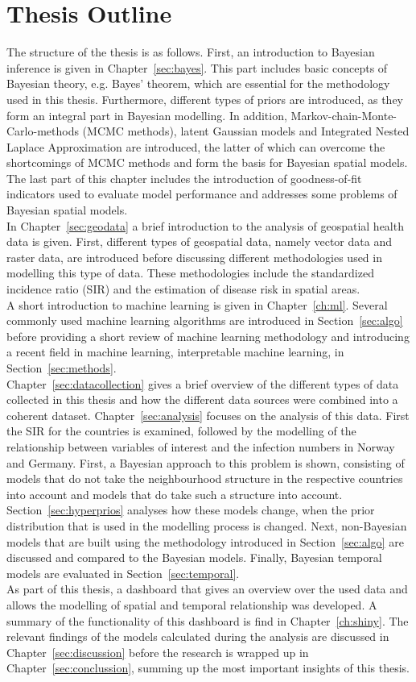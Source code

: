\section{Thesis Outline}
The structure of the thesis is as follows. First, an introduction to Bayesian inference is given in Chapter~\ref{sec:bayes}. This part includes basic concepts of Bayesian theory, e.g. Bayes' theorem, which are essential for the methodology used in this thesis. Furthermore, different types of priors are introduced, as they form an integral part in Bayesian modelling. In addition, Markov-chain-Monte-Carlo-methods (MCMC methods), latent Gaussian models and Integrated Nested Laplace Approximation are introduced, the latter of which can overcome the shortcomings of MCMC methods and form the basis for Bayesian spatial models. The last part of this chapter includes the introduction of goodness-of-fit indicators used to evaluate model performance and addresses some problems of Bayesian spatial models. \\
In Chapter~\ref{sec:geodata} a brief introduction to the analysis of geospatial health data is given. First, different types of geospatial data, namely vector data and raster data, are introduced before discussing different methodologies used in modelling this type of data. These methodologies include the standardized incidence ratio (SIR) and the estimation of disease risk in spatial areas. \\
A short introduction to machine learning is given in Chapter~\ref{ch:ml}. Several commonly used machine learning algorithms are introduced in Section~\ref{sec:algo} before providing a short review of machine learning methodology and introducing a recent field in machine learning, interpretable machine learning, in Section~\ref{sec:methods}. \\
Chapter~\ref{sec:datacollection} gives a brief overview of the different types of data collected in this thesis and how the different data sources were combined into a coherent dataset. 
Chapter~\ref{sec:analysis} focuses on the analysis of this data. First the SIR for the countries is examined, followed by the modelling of the relationship between variables of interest and the infection numbers in Norway and Germany. First, a Bayesian approach to this problem is shown, consisting of models that do not take the neighbourhood structure in the respective countries into account and models that do take such a structure into account. Section~\ref{sec:hyperprios} analyses how these models change, when the prior distribution that is used in the modelling process is changed. Next, non-Bayesian models that are built using the methodology introduced in Section~\ref{sec:algo} are discussed and compared to the Bayesian models. Finally, Bayesian temporal models are evaluated in Section~\ref{sec:temporal}. \\
As part of this thesis, a dashboard that gives an overview over the used data and allows the modelling of spatial and temporal relationship was developed. A summary of the functionality of this dashboard is find in Chapter~\ref{ch:shiny}.
The relevant findings of the models calculated during the analysis are discussed in Chapter~\ref{sec:discussion} before the research is wrapped up in Chapter~\ref{sec:conclussion}, summing up the most important insights of this thesis.